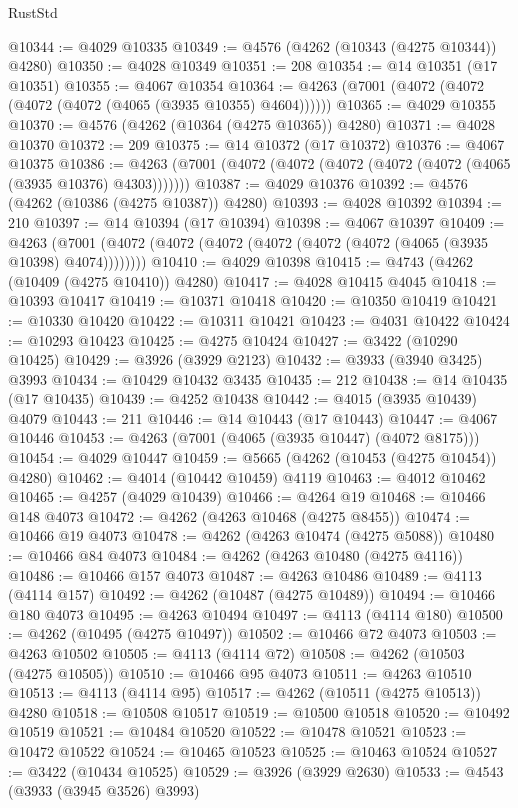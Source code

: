 \begin{lexlean}{RustStd}
\begin{coremodule}
@10344 := @4029 @10335
@10349 := @4576 (@4262 (@10343 (@4275 @10344)) @4280)
@10350 := @4028 @10349
@10351 := 208
@10354 := @14 @10351 (@17 @10351)
@10355 := @4067 @10354
@10364 := @4263 (@7001 (@4072 (@4072 (@4072 (@4072 (@4065 (@3935 @10355) @4604))))))
@10365 := @4029 @10355
@10370 := @4576 (@4262 (@10364 (@4275 @10365)) @4280)
@10371 := @4028 @10370
@10372 := 209
@10375 := @14 @10372 (@17 @10372)
@10376 := @4067 @10375
@10386 := @4263 (@7001 (@4072 (@4072 (@4072 (@4072 (@4072 (@4065 (@3935 @10376) @4303)))))))
@10387 := @4029 @10376
@10392 := @4576 (@4262 (@10386 (@4275 @10387)) @4280)
@10393 := @4028 @10392
@10394 := 210
@10397 := @14 @10394 (@17 @10394)
@10398 := @4067 @10397
@10409 := @4263 (@7001 (@4072 (@4072 (@4072 (@4072 (@4072 (@4072 (@4065 (@3935 @10398) @4074))))))))
@10410 := @4029 @10398
@10415 := @4743 (@4262 (@10409 (@4275 @10410)) @4280)
@10417 := @4028 @10415 @4045
@10418 := @10393 @10417
@10419 := @10371 @10418
@10420 := @10350 @10419
@10421 := @10330 @10420
@10422 := @10311 @10421
@10423 := @4031 @10422
@10424 := @10293 @10423
@10425 := @4275 @10424
@10427 := @3422 (@10290 @10425)
@10429 := @3926 (@3929 @2123)
@10432 := @3933 (@3940 @3425) @3993
@10434 := @10429 @10432 @3435
@10435 := 212
@10438 := @14 @10435 (@17 @10435)
@10439 := @4252 @10438
@10442 := @4015 (@3935 @10439) @4079
@10443 := 211
@10446 := @14 @10443 (@17 @10443)
@10447 := @4067 @10446
@10453 := @4263 (@7001 (@4065 (@3935 @10447) (@4072 @8175)))
@10454 := @4029 @10447
@10459 := @5665 (@4262 (@10453 (@4275 @10454)) @4280)
@10462 := @4014 (@10442 @10459) @4119
@10463 := @4012 @10462
@10465 := @4257 (@4029 @10439)
@10466 := @4264 @19
@10468 := @10466 @148 @4073
@10472 := @4262 (@4263 @10468 (@4275 @8455))
@10474 := @10466 @19 @4073
@10478 := @4262 (@4263 @10474 (@4275 @5088))
@10480 := @10466 @84 @4073
@10484 := @4262 (@4263 @10480 (@4275 @4116))
@10486 := @10466 @157 @4073
@10487 := @4263 @10486
@10489 := @4113 (@4114 @157)
@10492 := @4262 (@10487 (@4275 @10489))
@10494 := @10466 @180 @4073
@10495 := @4263 @10494
@10497 := @4113 (@4114 @180)
@10500 := @4262 (@10495 (@4275 @10497))
@10502 := @10466 @72 @4073
@10503 := @4263 @10502
@10505 := @4113 (@4114 @72)
@10508 := @4262 (@10503 (@4275 @10505))
@10510 := @10466 @95 @4073
@10511 := @4263 @10510
@10513 := @4113 (@4114 @95)
@10517 := @4262 (@10511 (@4275 @10513)) @4280
@10518 := @10508 @10517
@10519 := @10500 @10518
@10520 := @10492 @10519
@10521 := @10484 @10520
@10522 := @10478 @10521
@10523 := @10472 @10522
@10524 := @10465 @10523
@10525 := @10463 @10524
@10527 := @3422 (@10434 @10525)
@10529 := @3926 (@3929 @2630)
@10533 := @4543 (@3933 (@3945 @3526) @3993)

\end{coremodule}
\end{lexlean}
